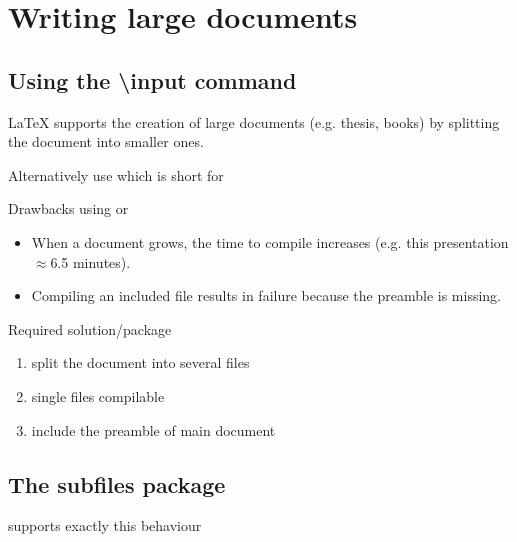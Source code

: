 \section{Writing large documents}

\subsection{Using the \textbackslash{}input command}
\begin{frame}
	\LaTeX{} supports the creation of large documents (e.g. thesis, books) by
	splitting the document into smaller ones.


	Alternatively use  which is short for
\end{frame}

\begin{frame}
	\begin{block}{Drawbacks using  or }
		\begin{itemize}
			\item When a document grows, the time to compile increases (e.g. this
				presentation $\approx$6.5 minutes).
			\item Compiling an included file results in failure because the preamble is
				missing.
		\end{itemize}
	\end{block}
	\begin{block}{Required solution/package}
		\begin{enumerate}
			\item split the document into several files
			\item single files compilable
			\item include the preamble of main document
		\end{enumerate}
	\end{block}
\end{frame}

\subsection{The subfiles package}
\begin{frame}
	 supports exactly this behaviour
	{\tiny {}}
\end{frame}
\begin{frame}
\end{frame}

